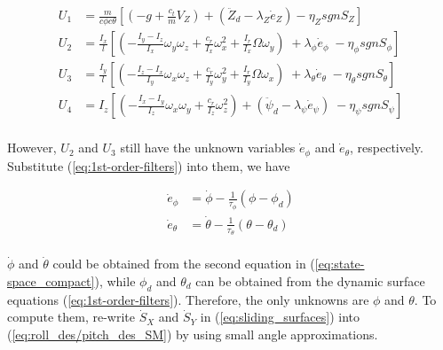 \documentclass[journal,11pt,onecolumn,draftclsnofoot,]{IEEEtran}
\begin{document}
\begingroup\makeatletter{}\check@mathfonts
\begin{equation}
\label{eq:U_SM}
\begin{split}
U_1 &=  \frac{m}{c\phi c\theta} \left[ \left( -g+\frac{c_t}{m}V_Z \right) + \left(\ddot{Z}_d - \lambda_Z \dot{e}_Z \right) - \eta_Z sgn S_Z \right] \\
U_2 &= \frac{I_x}{l}\left[ \left( -\frac{I_y-I_z}{I_x} \omega_y \omega_z + \frac{c_r}{I_x} \omega_x^2 + \frac{I_r}{I_x} \Omega \omega_y \right)\; + \lambda_\phi \dot{e}_\phi \; - \eta_\phi sgn S_\phi \right] \\
U_3 &= \frac{I_y}{l}\left[ \left( -\frac{I_z-I_x}{I_y} \omega_x \omega_z + \frac{c_r}{I_y} \omega_y^2 + \frac{I_r}{I_y} \Omega \omega_x \right)\; + \lambda_\theta \dot{e}_\theta \; - \eta_\theta sgn S_\theta \right] \\
U_4 &=  I_z \left[ \left( -\frac{I_x-I_y}{I_z} \omega_x \omega_y + \frac{c_r}{I_z} \omega_z^2 \right) +  \left( \ddot{\psi}_d - \lambda_\psi \dot{e}_\psi\right) \; - \eta_\psi sgn S_\psi \right] \\
\end{split}
\end{equation}
\endgroup

However, $U_2$ and $U_3$ still have the unknown variables $\dot{e}_\phi$ and $\dot{e}_\theta$, respectively. Substitute (\ref{eq:1st-order-filters}) into them, we have

\begin{equation*}
\label{eq:e_dot}
\begin{split}
\dot{e}_\phi   &= \dot{\phi}-\frac{1}{\tau_\phi} \left( \phi - \phi_d \right)\\
\dot{e}_\theta &= \dot{\theta}-\frac{1}{\tau_\theta} \left( \theta - \theta_d \right)\\
\end{split}
\end{equation*}

$\dot{\phi}$ and $\dot{\theta}$ could be obtained from the second equation in (\ref{eq:state-space_compact}), while $\phi_d$ and $\theta_d$ can be obtained from the dynamic surface equations (\ref{eq:1st-order-filters}). Therefore, the only unknowns are $\phi$ and $\theta$. To compute them, re-write $\dot{S}_X$ and $\dot{S}_Y$ in (\ref{eq:sliding_surfaces}) into (\ref{eq:roll_des/pitch_des_SM}) by using small angle approximations.
\end{document}

